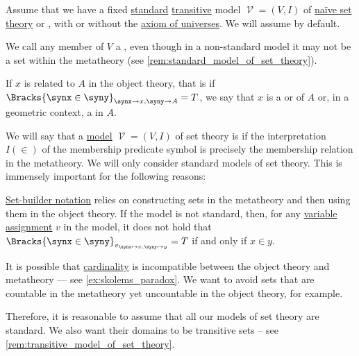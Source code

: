 \begin{definition}\label{def:set}\mimprovised
  Assume that we have a fixed \hyperref[rem:standard_model_of_set_theory]{standard} \hyperref[rem:transitive_model_of_set_theory]{transitive} model \( \mscrV = (V, I) \) of \hyperref[def:naive_set_theory]{na\"ive set theory} or \hyperref[def:zfc]{}, with or without the \hyperref[def:axiom_of_universes]{axiom of universes}. We will assume  by default.

  We call any member of \( V \) a , even though in a non-standard model it may not be a set within the metatheory (see \cref{rem:standard_model_of_set_theory}).

  If \( x \) is related to \( A \) in the object theory, that is if \( \Bracks{\synx \in \syny}_{\synx \to x, \syny \to A} = T \), we say that \( x \) is a  or  of \( A \) or, in a geometric context, a  in \( A \).
\end{definition}

\begin{remark}\label{rem:standard_model_of_set_theory}
  We will say that a \hyperref[def:first_order_model]{model} \( \mscrV = (V, I) \) of set theory is  if the interpretation \( I(\in) \) of the membership predicate symbol is precisely the membership relation in the metatheory. We will only consider standard models of set theory. This is immensely important for the following reasons:

  \begin{itemize}
     \hyperref[def:set_builder_notation]{Set-builder notation} relies on constructing sets in the metatheory and then using them in the object theory. If the model is not standard, then, for any \hyperref[def:first_order_valuation/variable_assignment]{variable assignment} \( v \) in the model, it does not hold that \( \Bracks{\synx \in \syny}_{v_{\synx \mapsto x, \syny \mapsto y}} = T \) if and only if \( x \in y \).

     It is possible that \hyperref[thm:cardinality_existence]{cardinality} is incompatible between the object theory and metatheory --- see \cref{ex:skolems_paradox}. We want to avoid sets that are countable in the metatheory yet uncountable in the object theory, for example.
  \end{itemize}

  Therefore, it is reasonable to assume that all our models of set theory are standard. We also want their domains to be transitive sets -- see \cref{rem:transitive_model_of_set_theory}.
\end{remark}

